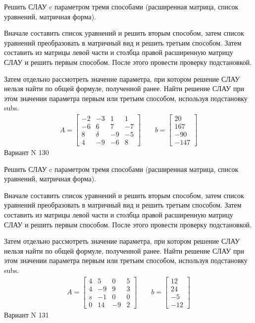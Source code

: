\documentclass[11pt]{report}
\begin{document}
Решить СЛАУ c параметром тремя способами (расширенная матрица, список уравнений, матричная форма).

Вначале составить список уравнений и решить вторым способом,
затем список уравнений преобразовать в матричный вид и решить третьим способом.
Затем составить из матрицы левой части и столбца правой расширенную матрицу СЛАУ и решить первым способом.
После этого провести проверку подстановкой.

Затем отдельно рассмотреть значение параметра, при котором решение СЛАУ нельзя найти по общей формуле,
полученной ранее.
Найти решение СЛАУ при этом значении параметра первым или третьим способом, используя подстановку subs.
\begin{align*}
    A = \left[\begin{matrix}-2 & -3 & 1 & 1\\-6 & 6 & 7 & -7\\8 & \delta & -9 & -5\\4 & -9 & -6 & 8\end{matrix}\right]
\qquad b = \left[\begin{matrix}20\\167\\-90\\-147\end{matrix}\right]
\end{align*}
\newpage
Вариант N 130


Решить СЛАУ c параметром тремя способами (расширенная матрица, список уравнений, матричная форма).

Вначале составить список уравнений и решить вторым способом,
затем список уравнений преобразовать в матричный вид и решить третьим способом.
Затем составить из матрицы левой части и столбца правой расширенную матрицу СЛАУ и решить первым способом.
После этого провести проверку подстановкой.

Затем отдельно рассмотреть значение параметра, при котором решение СЛАУ нельзя найти по общей формуле,
полученной ранее.
Найти решение СЛАУ при этом значении параметра первым или третьим способом, используя подстановку subs.
\begin{align*}
    A = \left[\begin{matrix}4 & 5 & 0 & 5\\4 & -9 & 9 & 3\\s & -1 & 0 & 0\\0 & 14 & -9 & 2\end{matrix}\right]
\qquad b = \left[\begin{matrix}12\\24\\-5\\-12\end{matrix}\right]
\end{align*}
\newpage
Вариант N 131
\end{document}
